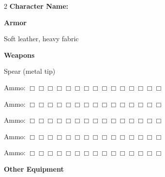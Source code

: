 \documentclass[10pt]{article}
\begin{document}
\begin{multicols}{2}
\textbf{Character Name:} \hrulefill

\vspace{24pt}

\textbf{Armor}


Soft leather, heavy fabric




\hrulefill


\hrulefill


\hrulefill



\vspace{24pt}

\textbf{Weapons}


Spear (metal tip)




\hrulefill

Ammo: $\Box \Box \Box \Box \Box \Box \Box \Box \Box \Box \Box \Box \Box \Box \Box$ 


\hrulefill

Ammo: $\Box \Box \Box \Box \Box \Box \Box \Box \Box \Box \Box \Box \Box \Box \Box$ 


\hrulefill

Ammo: $\Box \Box \Box \Box \Box \Box \Box \Box \Box \Box \Box \Box \Box \Box \Box$ 


\hrulefill

Ammo: $\Box \Box \Box \Box \Box \Box \Box \Box \Box \Box \Box \Box \Box \Box \Box$ 


\hrulefill

Ammo: $\Box \Box \Box \Box \Box \Box \Box \Box \Box \Box \Box \Box \Box \Box \Box$ 



\vspace{24pt}

\textbf{Other Equipment}




\hrulefill


\hrulefill


\hrulefill


\hrulefill


\hrulefill


\hrulefill


\hrulefill


\hrulefill


\hrulefill


\hrulefill


\hrulefill


\hrulefill



\end{multicols}
\end{document}
